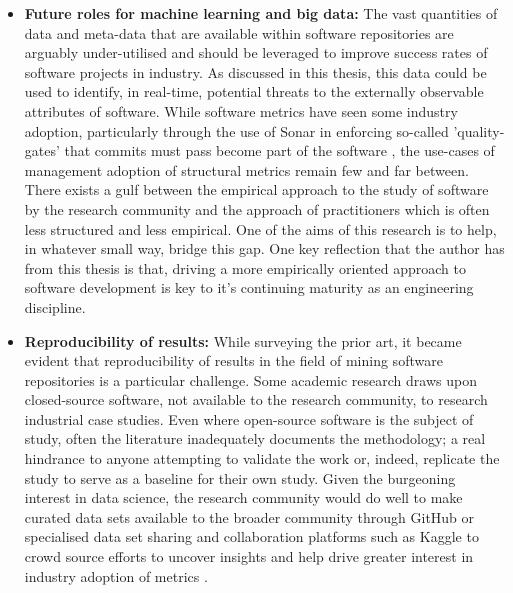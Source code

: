 \begin{itemize}
\item  \textbf{Future roles for machine learning and big data: } The vast quantities of data and meta-data that are available within software repositories are arguably under-utilised and should be leveraged to improve success rates of software projects in industry. As discussed in this thesis, this data could be used to identify, in real-time, potential threats to the externally observable attributes of software. While software metrics have seen some industry adoption, particularly through the use of Sonar  in enforcing so-called 'quality-gates' that commits must pass become part of the software \citep{ampatzoglou2018framework}, the use-cases of management adoption of  structural metrics remain few and far between. There exists a gulf between the empirical approach to the study of software by the research community and the approach of practitioners which is often less structured and less empirical. One of the aims of this research is to help, in whatever small way, bridge this gap. One key reflection that the author has from this thesis is that, driving a more empirically oriented approach to software development is key to it's continuing maturity as an engineering discipline.

\item  \textbf{Reproducibility of results: } While surveying the prior art, it became evident that reproducibility of results in the field of mining software repositories is a particular challenge. Some academic research draws upon closed-source software, not available to the research community, to research industrial case studies. Even where open-source software is the subject of study, often the literature inadequately documents the methodology; a real hindrance to anyone attempting to validate the work or, indeed, replicate the study to serve as a baseline for their own study. Given the burgeoning interest in data science, the research community would do well to make curated data sets available to the broader community through GitHub or specialised data set sharing and collaboration platforms such as Kaggle to crowd source efforts to uncover insights and help drive greater interest in industry adoption of metrics \citep{github, kaggle}.

\end{itemize}

